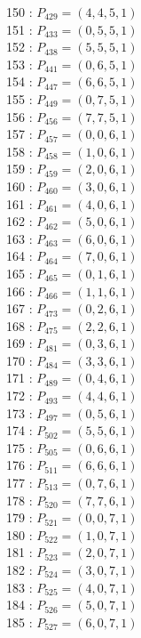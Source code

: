 \documentclass{article}
\begin{document}
{\begin{multicols}{3}
150 : $P_{429}=( 4, 4, 5, 1 )$\\
151 : $P_{433}=( 0, 5, 5, 1 )$\\
152 : $P_{438}=( 5, 5, 5, 1 )$\\
153 : $P_{441}=( 0, 6, 5, 1 )$\\
154 : $P_{447}=( 6, 6, 5, 1 )$\\
155 : $P_{449}=( 0, 7, 5, 1 )$\\
156 : $P_{456}=( 7, 7, 5, 1 )$\\
157 : $P_{457}=( 0, 0, 6, 1 )$\\
158 : $P_{458}=( 1, 0, 6, 1 )$\\
159 : $P_{459}=( 2, 0, 6, 1 )$\\
160 : $P_{460}=( 3, 0, 6, 1 )$\\
161 : $P_{461}=( 4, 0, 6, 1 )$\\
162 : $P_{462}=( 5, 0, 6, 1 )$\\
163 : $P_{463}=( 6, 0, 6, 1 )$\\
164 : $P_{464}=( 7, 0, 6, 1 )$\\
165 : $P_{465}=( 0, 1, 6, 1 )$\\
166 : $P_{466}=( 1, 1, 6, 1 )$\\
167 : $P_{473}=( 0, 2, 6, 1 )$\\
168 : $P_{475}=( 2, 2, 6, 1 )$\\
169 : $P_{481}=( 0, 3, 6, 1 )$\\
170 : $P_{484}=( 3, 3, 6, 1 )$\\
171 : $P_{489}=( 0, 4, 6, 1 )$\\
172 : $P_{493}=( 4, 4, 6, 1 )$\\
173 : $P_{497}=( 0, 5, 6, 1 )$\\
174 : $P_{502}=( 5, 5, 6, 1 )$\\
175 : $P_{505}=( 0, 6, 6, 1 )$\\
176 : $P_{511}=( 6, 6, 6, 1 )$\\
177 : $P_{513}=( 0, 7, 6, 1 )$\\
178 : $P_{520}=( 7, 7, 6, 1 )$\\
179 : $P_{521}=( 0, 0, 7, 1 )$\\
180 : $P_{522}=( 1, 0, 7, 1 )$\\
181 : $P_{523}=( 2, 0, 7, 1 )$\\
182 : $P_{524}=( 3, 0, 7, 1 )$\\
183 : $P_{525}=( 4, 0, 7, 1 )$\\
184 : $P_{526}=( 5, 0, 7, 1 )$\\
185 : $P_{527}=( 6, 0, 7, 1 )$\\

\end{multicols}}
\end{document}
